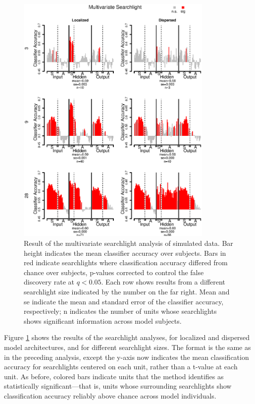\begin{figure}
\centering
\includegraphics[width=0.85\textwidth]{figures/figure5.eps}
\caption{Result of the multivariate searchlight analysis of simulated data. Bar height indicates the mean classifier accuracy over subjects. Bars in red indicate searchlights where classification accuracy differed from chance over subjects, p-values corrected to control the false discovery rate at $q<0.05$. Each row shows results from a different searchlight size indicated by the number on the far right. Mean and se indicate the mean and standard error of the classifier accuracy, respectively; n indicates the number of units whose searchlights shows significant information across model subjects.}
\label{fig.searchlight} 
\end{figure}

Figure \ref{fig.searchlight} shows the results of the searchlight analyses, for localized and dispersed model architectures, and for different searchlight sizes. The format is the same as in the preceding analysis, except the y-axis now indicates the mean classification accuracy for searchlights centered on each unit, rather than a t-value at each unit. As before, colored bars indicate units that the method identifies as statistically significant---that is, units whose surrounding searchlights show classification accuracy reliably above chance across model individuals.

